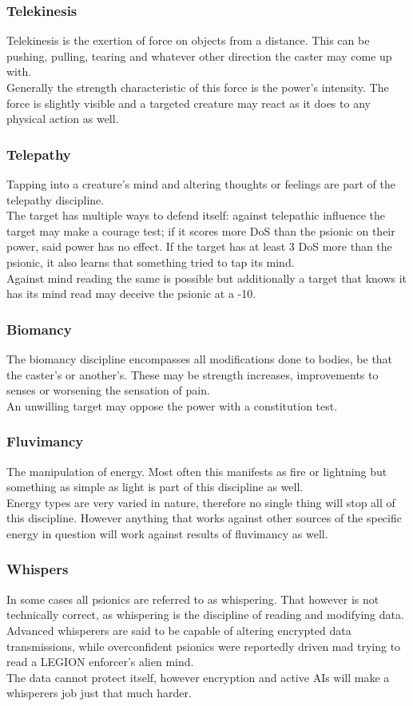 \documentclass[12pt,a4paper,openany]{book}
\begin{document}
	\subsubsection*{Telekinesis}
	Telekinesis is the exertion of force on objects from a distance. This can be pushing, pulling, tearing and whatever other direction the caster may come up with.\\
	Generally the strength characteristic of this force is the power's intensity. The force is slightly visible and a targeted creature may react as it does to any physical action as well.
	\subsubsection*{Telepathy}
	Tapping into a creature's mind and altering thoughts or feelings are part of the telepathy discipline.\\
	The target has multiple ways to defend itself: against telepathic influence the target may make a courage test; if it scores more DoS than the psionic on their power, said power has no effect. If the target has at least 3 DoS more than the psionic, it also learns that something tried to tap its mind.\\
	Against mind reading the same is possible but additionally a target that knows it has its mind read may deceive the psionic at a -10.
	\subsubsection*{Biomancy}
	The biomancy discipline encompasses all modifications done to bodies, be that the caster's or another's. These may be strength increases, improvements to senses or worsening the sensation of pain.\\
	An unwilling target may oppose the power with a constitution test.
	\subsubsection*{Fluvimancy}
	The manipulation of energy. Most often this manifests as fire or lightning but something as simple as light is part of this discipline as well.\\
	Energy types are very varied in nature, therefore no single thing will stop all of this discipline. However anything that works against other sources of the specific energy in question will work against results of fluvimancy as well.
	\subsubsection*{Whispers}
	In some cases all psionics are referred to as whispering. That however is not technically correct, as whispering is the discipline of reading and modifying data. Advanced whisperers are said to be capable of altering encrypted data transmissions, while overconfident psionics were reportedly driven mad trying to read a LEGION enforcer's alien mind.\\
	The data cannot protect itself, however encryption and active AIs will make a whisperers job just that much harder.
\end{document}
